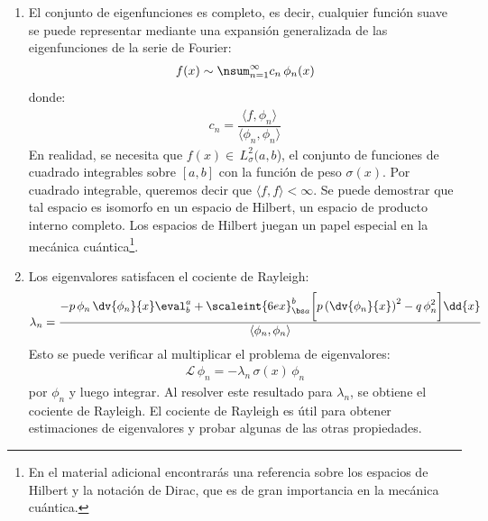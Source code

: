 \begin{enumerate}
\item El conjunto de eigenfunciones es completo, es decir, cualquier función suave se puede representar mediante una expansión generalizada de las eigenfunciones de la serie de Fourier:
\begin{align*}
f(x) \sim \nsum_{n=1}^{\infty} c_{n} \, \phi_{n} (x)
\end{align*}
donde:
\begin{align*}
c_{n} = \dfrac{\langle f, \phi_{n} \rangle}{\langle \phi_{n}, \phi_{n} \rangle}
\end{align*}
En realidad, se necesita que $f (x) \in \, L_{\sigma}^{2} (a, b$), el conjunto de funciones de cuadrado integrables sobre $[a, b]$ con la función de peso $\sigma (x)$. Por cuadrado integrable, queremos decir que $\langle f,  f \rangle < \infty$. Se puede demostrar que tal espacio es isomorfo en un espacio de Hilbert, un espacio de producto interno completo. Los espacios de Hilbert juegan un papel especial en la mecánica cuántica\footnote{En el material adicional encontrarás una referencia sobre los espacios de Hilbert y la notación de Dirac, que es de gran importancia en la mecánica cuántica.}.
\item Los eigenvalores satisfacen el cociente de Rayleigh:
\begin{align*}
\lambda_{n} = \dfrac{- p \, \phi_{n} \, \displaystyle \dv{\phi_{n}}{x} \eval_{b}^{a} + \scaleint{6ex}_{\bs a}^{b} \bigg[ p \left( \dv{\phi_{n}}{x} \right)^{2} - q \, \phi_{n}^{2} \bigg] \dd{x}}{\langle  \phi_{n}, \phi_{n} \rangle} 
\end{align*}
Esto se puede verificar al multiplicar el problema de eigenvalores:
\begin{align*}
\mathcal{L} \, \phi_{n} = - \lambda_{n} \, \sigma(x) \, \phi_{n}
\end{align*}
por $\phi_{n}$ y luego integrar. Al resolver este resultado para $\lambda_{n}$, se obtiene el cociente de Rayleigh. El cociente de Rayleigh es útil para obtener estimaciones de eigenvalores y probar algunas de las otras propiedades.
\end{enumerate}

